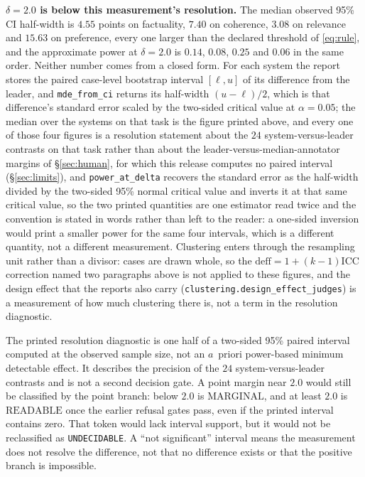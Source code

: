 \documentclass{article}
\newcommand{\ids}[1]{\texttt{\small #1}} %
\begin{document}
\textbf{$\delta = 2.0$ is below this measurement's resolution.} The median observed 95\% CI half-width is $4.55$ points on factuality, $7.40$ on coherence, $3.08$ on relevance and $15.63$ on preference, every one larger than the declared threshold of \eqref{eq:rule}, and the approximate power at $\delta = 2.0$ is $0.14$, $0.08$, $0.25$ and $0.06$ in the same order. Neither number comes from a closed form. For each system the report stores the paired case-level bootstrap interval $[\ell,u]$ of its difference from the leader, and \ids{mde\_from\_ci} returns its half-width $(u-\ell)/2$, which is that difference's standard error scaled by the two-sided critical value at $\alpha = 0.05$; the median over the systems on that task is the figure printed above, and every one of those four figures is a resolution statement about the $24$ system-versus-leader contrasts on that task rather than about the leader-versus-median-annotator margins of \S\ref{sec:human}, for which this release computes no paired interval (\S\ref{sec:limits}), and \ids{power\_at\_delta} recovers the standard error as the half-width divided by the two-sided 95\% normal critical value and inverts it at that same critical value, so the two printed quantities are one estimator read twice and the convention is stated in words rather than left to the reader: a one-sided inversion would print a smaller power for the same four intervals, which is a different quantity, not a different measurement. Clustering enters through the resampling unit rather than a divisor: cases are drawn whole, so the $\mathrm{deff} = 1+(k-1)\mathrm{ICC}$ correction named two paragraphs above is not applied to these figures, and the design effect that the reports also carry (\texttt{clustering.design\_effect\_judges}) is a measurement of how much clustering there is, not a term in the resolution diagnostic. 

The printed resolution diagnostic is one half of a two-sided 95\% paired interval computed at the observed sample size, not an $a$~priori power-based minimum detectable effect. It describes the precision of the $24$ system-versus-leader contrasts and is not a second decision gate. A point margin near $2.0$ would still be classified by the point branch: below $2.0$ is $\mathrm{MARGINAL}$, and at least $2.0$ is $\mathrm{READABLE}$ once the earlier refusal gates pass, even if the printed interval contains zero. That token would lack interval support, but it would not be reclassified as \texttt{UNDECIDABLE}. A ``not significant'' interval means the measurement does not resolve the difference, not that no difference exists or that the positive branch is impossible.
\end{document}
